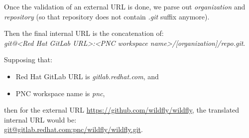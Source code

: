 \documentclass[../main.tex]{subfiles}
\begin{document}
Once the validation of an external URL is done, we parse out \textit{organization} and \textit{repository} (so that repository does not contain \textit{.git} suffix anymore).

Then the final internal URL is the concatenation of:\\
\textit{git@<Red Hat GitLab URL>:<PNC workspace name>/[organization]/repo.git}.

Supposing that:
\begin{itemize}
    \item Red Hat GitLab URL is \textit{gitlab.redhat.com}, and

    \item PNC workspace name is \textit{pnc},
\end{itemize}

then for the external URL \url{https://github.com/wildfly/wildfly}, the translated internal URL would be:\\
\url{git@gitlab.redhat.com:pnc/wildfly/wildfly.git}.
\end{document}
